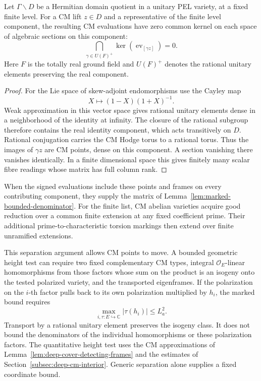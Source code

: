 \begin{auxlemma}\label{lem:marked-generic-cm-separation}
Let \(\Gamma\backslash D\) be a Hermitian domain quotient in a
unitary PEL variety, at a fixed finite level. For a CM lift
\(z\in D\) and a representative of the finite level component, the
resulting CM evaluations have zero common kernel on each space of
algebraic sections on this component:
\[
   \bigcap_{\gamma\in U(F)^+}\ker(\operatorname{ev}_{[\gamma z]})=0 .
\]
Here \(F\) is the totally real ground field and \(U(F)^+\) denotes
the rational unitary elements preserving the real component.
\end{auxlemma}
\begin{proof}
For the Lie space of skew-adjoint endomorphisms use the Cayley map
\[
                 X\longmapsto (1-X)(1+X)^{-1}.
\]
Weak approximation in this vector space gives rational unitary
elements dense in a neighborhood of the identity at infinity. The
closure of the rational subgroup therefore contains the real
identity component, which acts transitively on \(D\). Rational
conjugation carries the CM Hodge torus to a rational torus. Thus
the images of \(\gamma z\) are CM points, dense on this component.
A section vanishing there vanishes identically. In a finite
dimensional space this gives finitely many scalar fibre readings
whose matrix has full column rank.
\end{proof}

When the signed evaluations include these points and frames on
every contributing component, they supply the matrix of
Lemma~\ref{lem:marked-bounded-denominator}. For the finite list,
CM abelian varieties acquire good reduction over a common finite
extension at any fixed coefficient prime. Their additional
prime-to-characteristic torsion markings then extend over finite
unramified extensions. \cite[Theorem~6(a)]{serre-tate}

This separation argument allows CM points to move. A bounded
geometric height test can require two fixed complementary CM types,
integral \(\mathcal O_E\)-linear homomorphisms from those factors
whose sum on the product is an isogeny onto the tested polarized
variety, and the transported eigenframes.
If the polarization on the \(i\)-th factor pulls back to its own
polarization multiplied by \(h_i\), the marked bound requires
\[
         \max_{i,\tau:E\hookrightarrow\mathbb C}|\tau(h_i)|
                 \le L_a^2 .
\]
Transport by a rational unitary element preserves the isogeny
class. It does not bound the denominators of the individual
homomorphisms or these polarization factors. The quantitative height test uses the CM approximations of Lemma~\ref{lem:deep-cover-detecting-frames} and the estimates of Section~\ref{subsec:deep-cm-interior}. Generic separation alone supplies a fixed coordinate bound.

